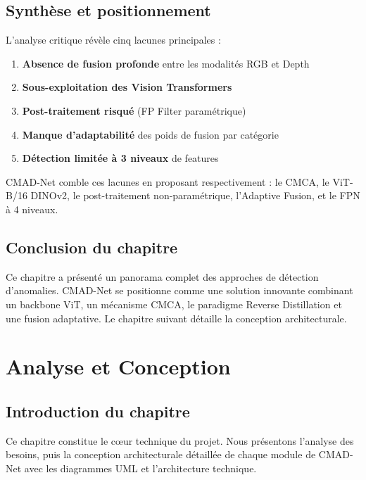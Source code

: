 \documentclass[12pt,a4paper,oneside]{report}
\begin{document}
\section{Synthèse et positionnement}

L'analyse critique révèle cinq lacunes principales :
\begin{enumerate}
    \item \textbf{Absence de fusion profonde} entre les modalités RGB et Depth
    \item \textbf{Sous-exploitation des Vision Transformers}
    \item \textbf{Post-traitement risqué} (FP Filter paramétrique)
    \item \textbf{Manque d'adaptabilité} des poids de fusion par catégorie
    \item \textbf{Détection limitée à 3 niveaux} de features
\end{enumerate}

CMAD-Net comble ces lacunes en proposant respectivement : le CMCA, le ViT-B/16 DINOv2, le post-traitement non-paramétrique, l'Adaptive Fusion, et le FPN à 4 niveaux.

\section*{Conclusion du chapitre}

Ce chapitre a présenté un panorama complet des approches de détection d'anomalies. CMAD-Net se positionne comme une solution innovante combinant un backbone ViT, un mécanisme CMCA, le paradigme Reverse Distillation et une fusion adaptative. Le chapitre suivant détaille la conception architecturale.


\chapter{Analyse et Conception}

\section*{Introduction du chapitre}

Ce chapitre constitue le c\oe{}ur technique du projet. Nous présentons l'analyse des besoins, puis la conception architecturale détaillée de chaque module de CMAD-Net avec les diagrammes UML et l'architecture technique.
\end{document}
